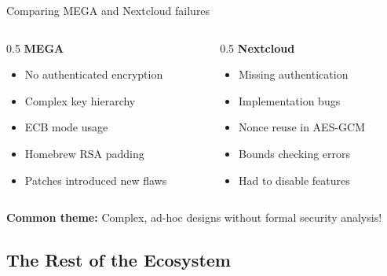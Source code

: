 \ifdefined\PRESENTATION\else\PassOptionsToClass{handout}{beamer}\fi\documentclass[aspectratio=169, lualatex]{beamer}
\begin{document}
\begin{frame}{Comparing MEGA and Nextcloud failures}
	\begin{columns}
		\begin{column}{0.5\textwidth}
			\textbf{MEGA}
			\vspace{0.3cm}
			\begin{itemize}
				\item No authenticated encryption
				\item Complex key hierarchy
				\item ECB mode usage
				\item Homebrew RSA padding
				\item Patches introduced new flaws
			\end{itemize}
		\end{column}
		\begin{column}{0.5\textwidth}
			\textbf{Nextcloud}
			\vspace{0.3cm}
			\begin{itemize}
				\item Missing authentication
				\item Implementation bugs
				\item Nonce reuse in AES-GCM
				\item Bounds checking errors
				\item Had to disable features
			\end{itemize}
		\end{column}
	\end{columns}
	\vspace{0.5cm}
	\begin{center}
		\textbf{Common theme:} Complex, ad-hoc designs without formal security analysis!
	\end{center}
\end{frame}

\subsection{The Rest of the Ecosystem}
\end{document}
